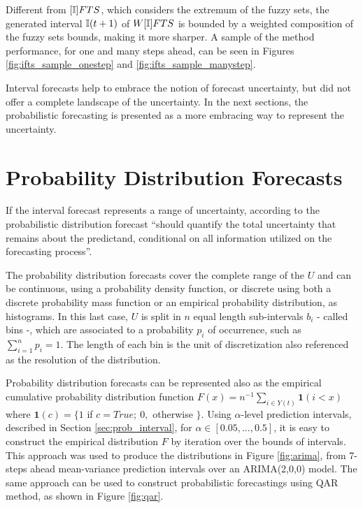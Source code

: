 Different from $[\mathbb{I}]FTS$, which considers the extremum of the fuzzy sets, the generated interval $\mathbb{I}(t+1)$ of $W[\mathbb{I}]FTS$ is bounded by a weighted composition of the fuzzy sets bounds, making it more sharper. A sample of the method performance, for one and many steps ahead, can be seen in Figures \ref{fig:ifts_sample_onestep} and \ref{fig:ifts_sample_manystep}. 

Interval forecasts help to embrace the notion of forecast uncertainty, but did not offer a complete landscape of the uncertainty. In the next sections, the probabilistic forecasting is presented as a more embracing way to represent the uncertainty.

%
\section{Probability Distribution Forecasts}
\label{sec:prob_distribution}

If the interval forecast represents a range of uncertainty, according to \cite{Krzysztofowicz2001} the probabilistic distribution forecast ``should quantify the total uncertainty that remains about the predictand, conditional on all information utilized on the forecasting process''. 

The probability distribution forecasts cover the complete range of the $U$ and can be continuous, using a probability density function, or discrete using both a discrete probability mass function or an empirical probability distribution, as histograms. In this last case, $U$ is split in $n$ equal length sub-intervals $b_i$ - called bins -, which are associated to a probability $p_i$ of occurrence, such as $\sum_{i=1}^n p_i = 1$. The length of each bin is the unit of discretization also referenced as the resolution of the distribution. 

Probability distribution forecasts can be represented also as the empirical cumulative probability distribution function $F(x) = n^{-1}\sum_{i\in Y(t)} \mathbf{1}(i < x)$ where $\mathbf{1}(c) = \{1$ if $c = True;\ 0,$ otherwise $\}$. Using $\alpha$-level prediction intervals, described in Section \ref{sec:prob_interval}, for $\alpha \in [0.05, ..., 0.5]$, it is easy to construct the empirical distribution $F$ by iteration over the bounds of intervals. This approach was used to produce the distributions in Figure \ref{fig:arima}, from 7-steps ahead mean-variance prediction intervals over an ARIMA(2,0,0) model. The same approach can be used to construct probabilistic forecastings using QAR method, as shown in Figure \ref{fig:qar}.

